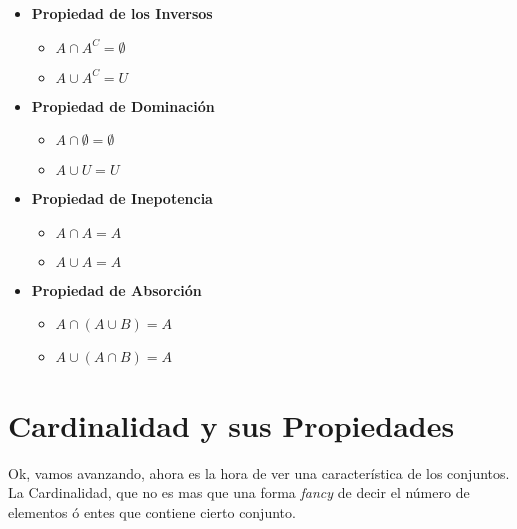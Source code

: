 \documentclass[12pt, fleqn]{report}                             %
\begin{document}
\begin{itemize}
                \item \textbf{Propiedad de los Inversos}
                    \begin{itemize}
                        \item $A \cap A^C = \emptyset$
                        \item $A \cup A^C = U$
                    \end{itemize}

                \item \textbf{Propiedad de Dominación}
                    \begin{itemize}
                        \item $A \cap \emptyset = \emptyset$
                        \item $A \cup U = U$
                    \end{itemize}

                \item \textbf{Propiedad de Inepotencia}
                    \begin{itemize}
                        \item $A \cap A = A$
                        \item $A \cup A = A$
                    \end{itemize}

                \item \textbf{Propiedad de Absorción}
                    \begin{itemize}
                        \item $A \cap (A \cup B) = A$
                        \item $A \cup (A \cap B) = A$
                    \end{itemize}

            \end{itemize}





        \clearpage
        \section{Cardinalidad y sus Propiedades}
                
            Ok, vamos avanzando, ahora es la hora de ver una característica de los conjuntos.
            La Cardinalidad, que no es mas que una forma \emph{fancy} de decir el número de 
            elementos ó entes que contiene cierto conjunto.
\end{document}
